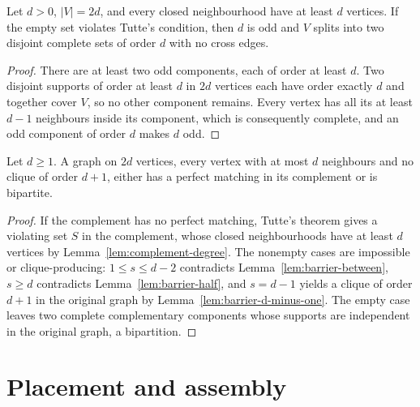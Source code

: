 \begin{lemma}
  \label{lem:barrier-empty}
  \leanok
  Let $d > 0$, $|V| = 2d$, and every closed neighbourhood have at least $d$ vertices. If
  the empty set violates Tutte's condition, then $d$ is odd and $V$ splits into two
  disjoint complete sets of order $d$ with no cross edges.
\end{lemma}
\begin{proof}
  There are at least two odd components, each of order at least $d$. Two disjoint supports
  of order at least $d$ in $2d$ vertices each have order exactly $d$ and together cover
  $V$, so no other component remains. Every vertex has all its at least $d - 1$
  neighbours inside its component, which is consequently complete, and an odd component of
  order $d$ makes $d$ odd.
\end{proof}

\begin{theorem}
  \label{thm:dichotomy}
  \leanok
  Let $d \ge 1$. A graph on $2d$ vertices, every vertex with at most $d$ neighbours and no
  clique of order $d + 1$, either has a perfect matching in its complement or is
  bipartite.
\end{theorem}
\begin{proof}
  If the complement has no perfect matching, Tutte's theorem gives a violating set $S$ in
  the complement, whose closed neighbourhoods have at least $d$ vertices by
  Lemma~\ref{lem:complement-degree}. The nonempty cases are impossible or
  clique-producing: $1 \le s \le d - 2$ contradicts Lemma~\ref{lem:barrier-between},
  $s \ge d$ contradicts Lemma~\ref{lem:barrier-half}, and $s = d - 1$ yields a clique of
  order $d + 1$ in the original graph by Lemma~\ref{lem:barrier-d-minus-one}. The empty
  case leaves two complete complementary components whose supports are independent in the
  original graph, a bipartition.
\end{proof}

\section{Placement and assembly}

